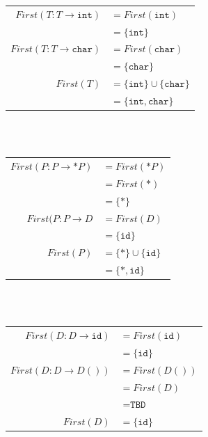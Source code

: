 \documentclass[fleqn]{article}
\begin{document}
\begin{enumerate}
  \begin{tabular}{| r   l |}
  \hline
  $First(T: T \rightarrow \texttt{int})$  & $= First(\texttt{int})$                     \\
                                          & $= \{\texttt{int}\}$                        \\
  \hline
  $First(T: T \rightarrow \texttt{char})$ & $= First(\texttt{char})$                    \\
                                          & $= \{\texttt{char}\}$                       \\
  \hline
  \hline
  $First(T)$                              & $= \{\texttt{int}\} \cup \{\texttt{char}\}$ \\
                                          & $= \{\texttt{int}, \texttt{char}\}$         \\
  \hline
  \end{tabular}\\\\

  \begin{tabular}{| r   l |}
  \hline
  $First(P: P \rightarrow * P)$  & $= First(* P)$                 \\
                                 & $= First(*)$                   \\
                                 & $= \{*\}$                      \\
  \hline
  $First(P: P \rightarrow D$     & $= First(D)$                   \\
                                 & $= \{\texttt{id}\}$            \\
  \hline
  \hline
  $First(P)$                     & $= \{*\} \cup \{\texttt{id}\}$ \\
                                 & $= \{*, \texttt{id}\}$         \\
  \hline
  \end{tabular}\\\\

  \begin{tabular}{| r   l |}
  \hline
  $First(D: D \rightarrow \texttt{id})$   & $= First(\texttt{id})$ \\
                                          & $= \{\texttt{id}\}$    \\
  \hline
  $First(D: D \rightarrow D ( ))$         & $= First(D ( ))$       \\
                                          & $= First(D)$           \\
                                          & $= \texttt{TBD}$       \\
  \hline
  \hline
  $First(D)$                              & $= \{\texttt{id}\}$    \\
  \hline
  \end{tabular}\\\\


\end{enumerate}
\end{document}
